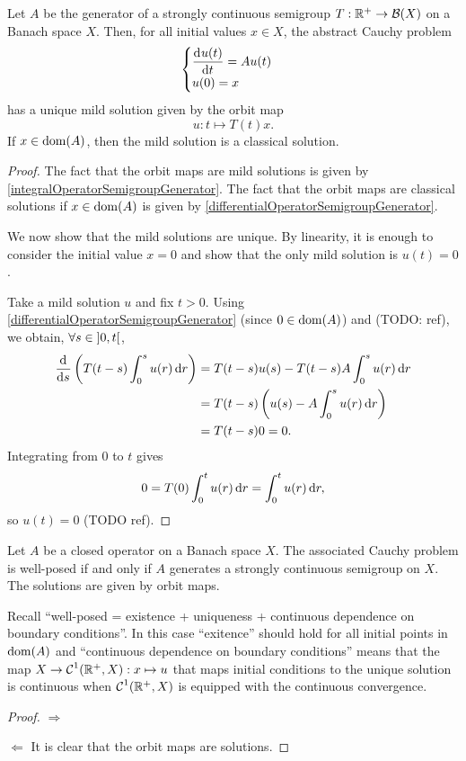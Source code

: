 \begin{proposition}
Let $A$ be the generator of a strongly continuous semigroup $T: \mathbb{R}^+\to \operatorname{\mathcal{B}}(X)$ on a Banach space $X$. Then, for all initial values $x\in X$, the abstract Cauchy problem
\[ \begin{cases}
\mathinner{ \dfrac{\operatorname{d \!}{^{}}u(t)}{\operatorname{d \!}{{t}^{}}} } = Au(t) \\ u(0) = x
\end{cases} \]
has a unique mild solution given by the orbit map
\[ u: t\mapsto T(t)x. \]
If $x\in \operatorname{dom}(A)$, then the mild solution is a classical solution.
\end{proposition}
\begin{proof}
The fact that the orbit maps are mild solutions is given by \ref{integralOperatorSemigroupGenerator}. The fact that the orbit maps are classical solutions if $x\in \operatorname{dom}(A)$ is given by \ref{differentialOperatorSemigroupGenerator}.

We now show that the mild solutions are unique. By linearity, it is enough to consider the initial value $x=0$ and show that the only mild solution is $u(t) = 0$.

Take a mild solution $u$ and fix $t >0$. Using \ref{differentialOperatorSemigroupGenerator} (since $0\in\operatorname{dom}(A)$) and (TODO: ref), we obtain, $\forall s\in\interval[o]{0,t}$,
\begin{align*}
\mathinner{ \dfrac{\operatorname{d \!}{^{}}}{\operatorname{d \!}{{s}^{}}} }\left(T(t-s)\int_0^su(r)\operatorname{d \!}{r}\right) &= T(t-s)u(s) - T(t-s)A\int_0^su(r)\operatorname{d \!}{r} \\
&= T(t-s)\left(u(s) - A\int_0^su(r)\operatorname{d \!}{r}\right) \\
&= T(t-s)0 = 0.
\end{align*}
Integrating from $0$ to $t$ gives
\[ 0 = T(0)\int_0^tu(r)\operatorname{d \!}{r} = \int_0^tu(r)\operatorname{d \!}{r}, \]
so $u(t) = 0$ (TODO ref).
\end{proof}

\begin{proposition}
Let $A$ be a closed operator on a Banach space $X$. The associated Cauchy problem is well-posed \textup{if and only if} $A$ generates a strongly continuous semigroup on $X$. The solutions are given by orbit maps.
\end{proposition}
Recall ``well-posed = existence + uniqueness + continuous dependence on boundary conditions''.
In this case  ``exitence'' should hold for all initial points in $\operatorname{dom}(A)$ and ``continuous dependence on boundary conditions'' means that the map $X\to \operatorname{\mathcal{C}}^1(\mathbb{R}^+, X): x\mapsto u$ that maps initial conditions to the unique solution is continuous when $\operatorname{\mathcal{C}}^1(\mathbb{R}^+, X)$ is equipped with the continuous convergence.
\begin{proof}
$\boxed{\Rightarrow}$


$\boxed{\Leftarrow}$ It is clear that the orbit maps are solutions. 
\end{proof}

